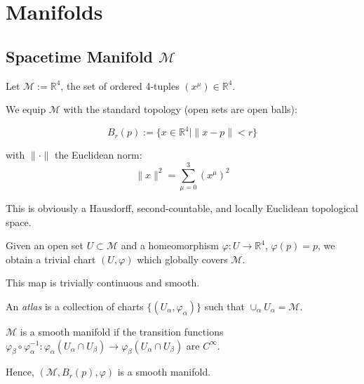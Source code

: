 \section{Manifolds}


\subsection{Spacetime Manifold $\mathcal{M}$}\label{sec:spacetime-manifold}

Let $\mathcal{M} := \mathbb{R}^4$, the set of ordered 4-tuples $(x^\mu) \in \mathbb{R}^4$.

We equip $\mathcal{M}$ with the standard topology (open sets are open balls):

\[
B_r(p) := \{ x \in \mathbb{R}^4 \mid \|x - p\| < r \}
\]

with $\| \cdot \|$ the Euclidean norm:
\[
\|x\|^2 = \sum_{\mu=0}^3 (x^\mu)^2
\]

This is obviously a Hausdorff, second-countable, and locally Euclidean topological space.

Given an open set $U \subset \mathcal{M}$ and a homeomorphism $\varphi: U \to \mathbb{R}^4$, $\varphi(p) = p$, we obtain a trivial chart $(U, \varphi)$ which globally covers $\mathcal{M}$.

This map is trivially continuous and smooth.

An \textit{atlas} is a collection of charts $\{(U_\alpha, \varphi_\alpha)\}$ such that $\cup_\alpha U_\alpha = \mathcal{M}$.

$\mathcal{M}$ is a smooth manifold if the transition functions $\varphi_\beta \circ \varphi_\alpha^{-1}: \varphi_\alpha(U_\alpha \cap U_\beta) \to \varphi_\beta(U_\alpha \cap U_\beta)$ are $C^\infty$.

Hence, $(\mathcal{M}, B_r(p), \varphi)$ is a smooth manifold.
